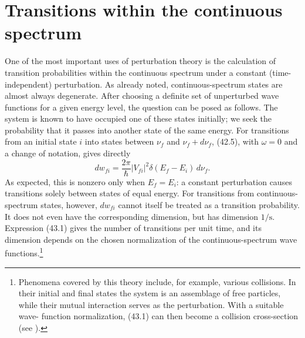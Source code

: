 \section{Transitions within the continuous spectrum}

One of the most important uses of perturbation theory is the calculation of
transition probabilities within the continuous spectrum under a constant
(time-independent) perturbation. As already noted, continuous-spectrum states
are almost always degenerate. After choosing a definite set of unperturbed
wave functions for a given energy level, the question can be posed as follows.
The system is known to have occupied one of these states initially; we seek
the probability that it passes into another state of the same energy. For
transitions from an initial state $i$ into states between $\nu_f$ and
$\nu_f+d\nu_f$, (42.5), with $\omega=0$ and a change of notation, gives
directly
\begin{equation}
  dw_{fi}=\frac{2\pi}{\hbar}|V_{fi}|^2
  \delta(E_f-E_i)\,d\nu_f.
  \tag{43.1}
\end{equation}
As expected, this is nonzero only when $E_f=E_i$: a constant perturbation
causes transitions solely between states of equal energy. For transitions
from continuous-spectrum states, however, $dw_{fi}$ cannot itself be treated
as a transition probability. It does not even have the corresponding
dimension, but has dimension $1/\mathrm{s}$. Expression (43.1) gives the
number of transitions per unit time, and its dimension depends on the chosen
normalization of the continuous-spectrum wave functions.\footnote{Phenomena
covered by this theory include, for example, various collisions. In their
initial and final states the system is an assemblage of free particles, while
their mutual interaction serves as the perturbation. With a suitable wave-
function normalization, (43.1) can then become a collision cross-section
(see ).}

